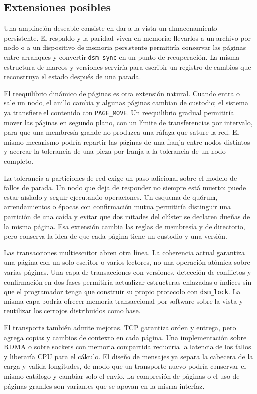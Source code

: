 \subsection{Extensiones posibles}

Una ampliación deseable consiste en dar a la vista un almacenamiento persistente. El respaldo y la paridad viven en memoria; llevarlos a un archivo por nodo o a un dispositivo de memoria persistente permitiría conservar las páginas entre arranques y convertir \texttt{dsm\_sync} en un punto de recuperación. La misma estructura de marcos y versiones serviría para escribir un registro de cambios que reconstruya el estado después de una parada.

El reequilibrio dinámico de páginas es otra extensión natural. Cuando entra o sale un nodo, el anillo cambia y algunas páginas cambian de custodio; el sistema ya transfiere el contenido con \texttt{PAGE\_MOVE}. Un reequilibrio gradual permitiría mover las páginas en segundo plano, con un límite de transferencias por intervalo, para que una membresía grande no produzca una ráfaga que sature la red. El mismo mecanismo podría repartir las páginas de una franja entre nodos distintos y acercar la tolerancia de una pieza por franja a la tolerancia de un nodo completo.

La tolerancia a particiones de red exige un paso adicional sobre el modelo de fallos de parada. Un nodo que deja de responder no siempre está muerto: puede estar aislado y seguir ejecutando operaciones. Un esquema de quórum, arrendamientos o épocas con confirmación mutua permitiría distinguir una partición de una caída y evitar que dos mitades del clúster se declaren dueñas de la misma página. Esa extensión cambia las reglas de membresía y de directorio, pero conserva la idea de que cada página tiene un custodio y una versión.

Las transacciones multiescritor abren otra línea. La coherencia actual garantiza una página con un solo escritor o varios lectores, no una operación atómica sobre varias páginas. Una capa de transacciones con versiones, detección de conflictos y confirmación en dos fases permitiría actualizar estructuras enlazadas o índices sin que el programador tenga que construir su propio protocolo con \texttt{dsm\_lock}. La misma capa podría ofrecer memoria transaccional por software sobre la vista y reutilizar los cerrojos distribuidos como base.

El transporte también admite mejoras. TCP garantiza orden y entrega, pero agrega copias y cambios de contexto en cada página. Una implementación sobre RDMA o sobre sockets con memoria compartida reduciría la latencia de los fallos y liberaría CPU para el cálculo. El diseño de mensajes ya separa la cabecera de la carga y valida longitudes, de modo que un transporte nuevo podría conservar el mismo catálogo y cambiar solo el envío. La compresión de páginas o el uso de páginas grandes son variantes que se apoyan en la misma interfaz.

